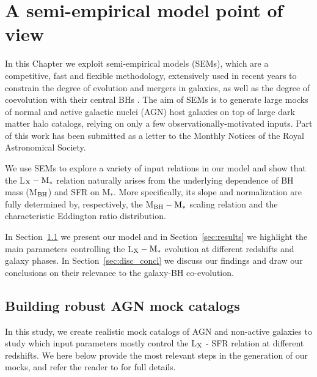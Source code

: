 \chapter{A semi-empirical model point of view} \label{ch:SEM}


In this Chapter we exploit semi-empirical models (SEMs), which are a competitive, fast and flexible methodology, extensively used in recent years to constrain the degree of evolution and mergers in galaxies, as well as the degree of coevolution with their central BHs \citep{2013ApJ...762...70C, 2019MNRAS.487..275G, 2019MNRAS.487.2005C, 2020arXiv201002957A}. The aim of SEMs is to generate large mocks of normal and 
active galactic nuclei (AGN) host galaxies
on top of large dark matter halo catalogs, relying on only a few observationally-motivated inputs. Part of this work has been submitted as a letter to the Monthly Notices of the Royal Astronomical Society.

We use SEMs to explore a variety of input relations in our model and show that the L$_{\rm X}-{\rm M}_{*}$ relation naturally arises from the underlying dependence of BH mass (M$_{\rm BH}$) and SFR on M$_*$. More specifically, its slope and normalization are fully determined by, respectively, the M$_{\rm BH}-{\rm M}_*$ scaling relation and the characteristic Eddington ratio distribution.

In Section~\ref{sec:model} we present our model and in Section~\ref{sec:results} we highlight the main parameters controlling the L$_{\rm X}-{\rm M}_*$ evolution at different redshifts and  galaxy phases.
In Section~\ref{sec:disc_concl} we discuss our findings and draw our conclusions on their relevance to the galaxy-BH co-evolution. %

\section{Building robust AGN mock catalogs}\label{sec:model}
In this study, we create realistic mock catalogs of AGN and non-active galaxies to study which input parameters mostly control the L$_{\rm X}$ - SFR relation at different redshifts. We here below provide the most relevant steps in the generation of our mocks, and refer the reader to \citet{Allevato21} for full details.

